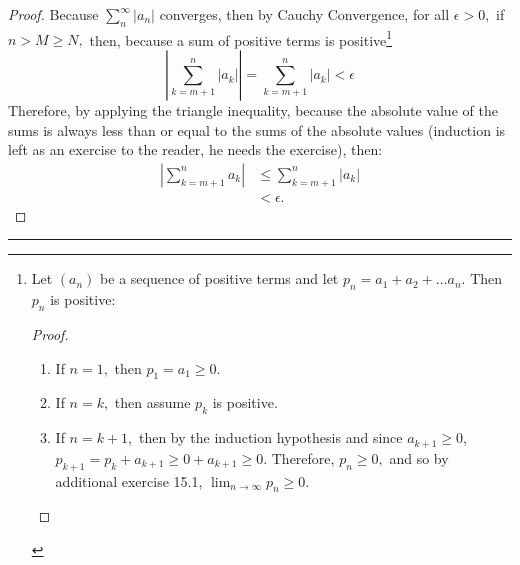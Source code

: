\documentclass[openany, amssymb, psamsfonts]{amsart}
\theoremstyle{definition}
\numberwithin{equation}{section}
\begin{document}
\begin{proof}
Because $\displaystyle\sum_{n}^\infty |a_n|$ converges, then by Cauchy Convergence, for all $\epsilon>0,$ if $n>M\geq N,$ then, because a sum of positive terms is positive\footnote{Let $(a_n)$ be a sequence of positive terms and let $p_n = a_1 + a_2 + \dots a_n.$ Then $p_n$ is positive: 
\begin{proof}
    \begin{enumerate}
        \item If $n = 1,$ then $p_1 = a_1\geq 0.$ 
        \item If $n = k,$ then assume $p_k$ is positive.
        \item If $n = k+1,$ then by the induction hypothesis and since $a_{k+1}\geq 0$, $p_{k+1} = p_k + a_{k+1}\geq 0 + a_{k+1} \geq 0.$ Therefore, $p_n\geq 0,$ and so by additional exercise 15.1, $\lim_{n\to \infty}p_n \geq 0.$
    \end{enumerate}
\end{proof}}
\[\left|\displaystyle\sum_{k = m+1}^n|a_k|\right| = \displaystyle\sum_{k = m+1}^n|a_k|< \epsilon\]
Therefore, by applying the triangle inequality, because the absolute value of the sums is always less than or equal to the sums of the absolute values (induction is left as an exercise to the reader, he needs the exercise), then:
\begin{align*}
    |\displaystyle\sum_{k = m+1}^na_k|& \leq\displaystyle\sum_{k = m+1}^n|a_k|\\
    &< \epsilon.
\end{align*}
\end{proof}\vspace{4pt}     \hrule   \vspace{4pt}
\end{document}
